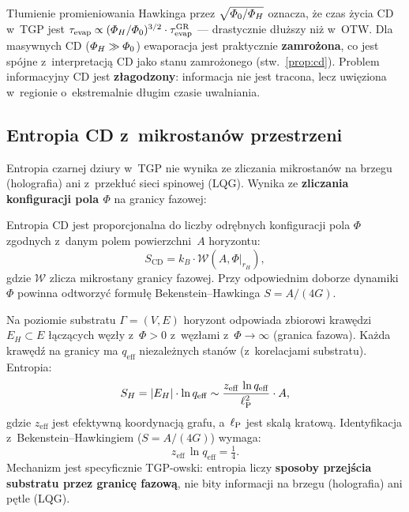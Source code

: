 \begin{remark}
T\l{}umienie promieniowania Hawkinga przez $\sqrt{\varPhi_0/\varPhi_H}$
oznacza, \.ze czas \.zycia CD w~TGP jest
$\tau_{\mathrm{evap}} \propto (\varPhi_H/\varPhi_0)^{3/2}
\cdot \tau_{\mathrm{evap}}^{\mathrm{GR}}$
--- drastycznie d\l{}u\.zszy ni\.z w~OTW. Dla masywnych CD
($\varPhi_H \gg \varPhi_0$) ewaporacja jest praktycznie
\textbf{zamro\.zona}, co jest sp\'ojne z~interpretacj\k{a}
CD jako stanu zamro\.zonego (stw.~\ref{prop:cd}).
Problem informacyjny CD jest \textbf{z\l{}agodzony}: informacja
nie jest tracona, lecz uwi\k{e}ziona w~regionie o~ekstremalnie
d\l{}ugim czasie uwalniania.
\end{remark}

\subsection{Entropia CD z~mikrostanów przestrzeni}\label{ssec:cd-entropia}

Entropia czarnej dziury w~TGP nie wynika ze zliczania
mikrostanów na brzegu (holografia) ani z~przek\l{}u\'c sieci
spinowej (LQG). Wynika ze \textbf{zliczania konfiguracji
pola $\Phi$} na granicy fazowej:

\begin{hypothesis}\label{hyp:entropy}
Entropia CD jest proporcjonalna do liczby odr\k{e}bnych
konfiguracji pola $\Phi$ zgodnych z~danym polem
powierzchni~$A$ horyzontu:
\begin{equation}\label{eq:S-CD}
    S_{\mathrm{CD}} = k_B \cdot \mathcal{W}(A, \Phi|_{r_H}),
\end{equation}
gdzie $\mathcal{W}$ zlicza mikrostany granicy fazowej.
Przy odpowiednim doborze dynamiki $\Phi$ powinna odtworzy\'c
formu\l{}\k{e} Bekenstein--Hawkinga $S = A/(4G)$.
\end{hypothesis}

\begin{proposition}\label{prop:S-BH}
Na poziomie substratu $\Gamma = (V, E)$ horyzont odpowiada
zbiorowi kraw\k{e}dzi $E_H \subset E$ \l{}\k{a}cz\k{a}cych
w\k{e}z\l{}y z~$\Phi > 0$ z~w\k{e}z\l{}ami z~$\Phi \to \infty$
(granica fazowa). Ka\.zda kraw\k{e}d\'z na granicy ma
$q_{\mathrm{eff}}$ niezale\.znych stan\'ow (z~korelacjami
substratu). Entropia:
\begin{equation}\label{eq:S-BH-TGP}
    S_H = |E_H| \cdot \ln q_{\mathrm{eff}}
    \sim \frac{z_{\mathrm{eff}}\,\ln q_{\mathrm{eff}}}{\ell_{\mathrm{P}}^2}
    \cdot A,
\end{equation}
gdzie $z_{\mathrm{eff}}$ jest efektywn\k{a} koordynacj\k{a}
grafu, a~$\ell_{\mathrm{P}}$ jest skal\k{a} kratow\k{a}. Identyfikacja
z~Bekenstein--Hawkingiem ($S = A/(4G)$) wymaga:
\begin{equation}
    z_{\mathrm{eff}}\,\ln q_{\mathrm{eff}} = \tfrac{1}{4}.
\end{equation}
Mechanizm jest specyficznie TGP-owski: entropia liczy
\textbf{sposoby przej\'scia substratu przez granic\k{e}
fazow\k{a}}, nie bity informacji na brzegu (holografia)
ani p\k{e}tle (LQG).
\end{proposition}

